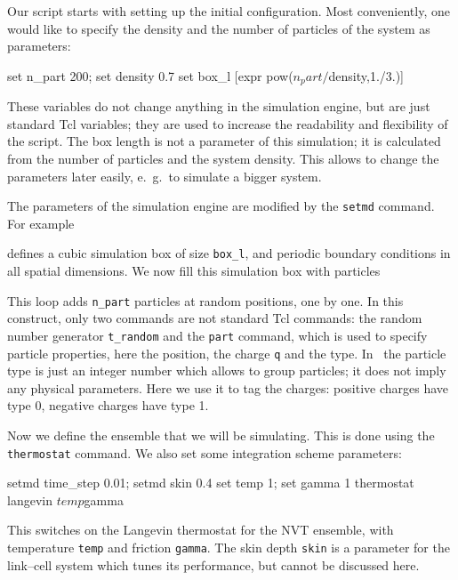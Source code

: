 Our script starts with setting up the initial configuration.  Most conveniently,
one would like to specify the density and the number of particles of the system
as parameters:
\begin{tclcode}
set n_part 200; set density 0.7
set box_l [expr pow($n_part/$density,1./3.)]
\end{tclcode}
These variables do not change anything in the simulation engine, but are just
standard Tcl variables; they are used to increase the readability and
flexibility of the script. The box length is not a parameter of this simulation;
it is calculated from the number of particles and the system density. This
allows to change the parameters later easily, e.~g.\ to simulate a bigger
system.

The parameters of the simulation engine are modified by the \verb|setmd|
command. For example
defines a cubic simulation box of size \verb|box_l|, and periodic boundary
conditions in all spatial dimensions. We now fill this simulation box with
particles
This loop adds \verb|n_part| particles at random positions, one by one.  In this
construct, only two commands are not standard Tcl commands: the random
number generator \verb|t_random| and the \verb|part| command, which is used to
specify particle properties, here the position, the charge \verb|q| and the
type. In \es\ the particle type is just an integer number which allows to group
particles; it does not imply any physical parameters. Here we use it to tag the
charges: positive charges have type 0, negative charges have type 1.

Now we define the ensemble that we will be simulating. This is done using the
\verb|thermostat| command. We also set some integration scheme parameters:
\begin{tclcode}
setmd time_step 0.01; setmd skin 0.4
set temp 1; set gamma 1
thermostat langevin $temp $gamma
\end{tclcode}
This switches on the Langevin thermostat for the NVT ensemble, with temperature
\verb|temp| and friction \verb|gamma|. The skin depth \verb|skin| is a parameter
for the link--cell system which tunes its performance, but cannot be discussed
here.

